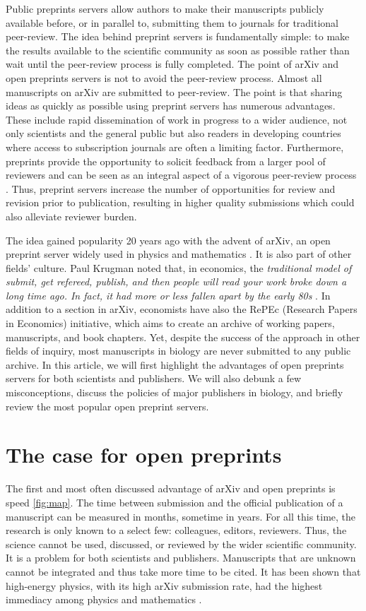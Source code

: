 \documentclass[letterpaper,twocolumn,superscriptaddress,showkeys]{revtex4-1}
\begin{document}
Public preprints servers allow authors to make their manuscripts publicly
available before, or in parallel to, submitting them to journals for traditional
peer-review. The idea behind preprint servers is fundamentally simple: to make
the results available to the scientific community as soon as possible rather
than wait until the peer-review process is fully completed. The point of arXiv
and open preprints servers is not to avoid the peer-review process. Almost all
manuscripts on arXiv are submitted to peer-review.  The point is that sharing
ideas as quickly as possible using preprint servers has numerous advantages.
These include rapid dissemination of work in progress to a wider audience, not
only scientists and the general public but also readers in developing countries
where access to subscription journals are often a limiting factor. Furthermore,
preprints provide the opportunity to solicit feedback from a larger pool of
reviewers and can be seen as an integral aspect of a vigorous peer-review
process \cite{hoc12}. Thus, preprint servers increase the number of
opportunities for review and revision prior to publication, resulting in higher
quality submissions which could also alleviate reviewer burden.

The idea gained popularity 20 years ago with the advent of arXiv, an open
preprint server widely used in physics and mathematics \cite{gin11}.  It is also
part of other fields' culture. Paul Krugman noted that, in economics, the
\emph{traditional model of submit, get refereed, publish, and then people will
read your work broke down a long time ago. In fact, it had more or less fallen
apart by the early 80s} \cite{kru12}. In addition to a section in arXiv,
economists have also the RePEc (Research Papers in Economics) initiative, which
aims to create an archive of working papers, manuscripts, and book chapters.
Yet, despite the success of the approach in other fields of inquiry, most
manuscripts in biology are never submitted to any public archive.  In this
article, we will first highlight the advantages of open preprints servers for
both scientists and publishers. We will also debunk a few misconceptions,
discuss the policies of major publishers in biology, and briefly review the most
popular open preprint servers.

\section{The case for open preprints}

The first and most often discussed advantage of arXiv and open preprints is
speed \ref{fig:map}. The time between submission and the official publication of
a manuscript can be measured in months, sometime in years. For all this time,
the research is only known to a select few: colleagues, editors, reviewers.
Thus, the science cannot be used, discussed, or reviewed by the wider scientific
community. It is a problem for both scientists and publishers. Manuscripts that
are unknown cannot be integrated and thus take more time to be cited. It has
been shown that high-energy physics, with its high arXiv submission rate, had
the highest immediacy among physics and mathematics \cite{pra05}.
\end{document}

